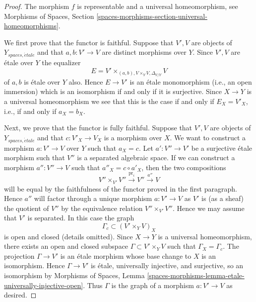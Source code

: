 \documentclass[10pt,a4paper]{amsart}
\theoremstyle{plain}
\theoremstyle{definition}
\theoremstyle{remark}
\numberwithin{equation}{subsection}
\def\etale{{\acute{e}tale}}
\begin{document}
\begin{proof}
The morphism $f$ is representable and a universal homeomorphism, see
Morphisms of Spaces,
Section \ref{spaces-morphisms-section-universal-homeomorphisms}.

\medskip\noindent
We first prove that the functor is faithful.
Suppose that $V', V$ are objects of $Y_{spaces, \etale}$ and
that $a, b : V' \to V$ are distinct morphisms over $Y$.
Since $V', V$ are \'etale over $Y$ the equalizer
$$
E =  V' \times_{(a, b), V \times_Y V, \Delta_{V/Y}} V
$$
of $a, b$ is \'etale over $Y$ also. Hence $E \to V'$ is an \'etale monomorphism
(i.e., an open immersion) which is an isomorphism if and only if it is
surjective. Since $X \to Y$ is a universal homeomorphism we see that this
is the case if and only if $E_X = V'_X$, i.e., if and only if $a_X = b_X$.

\medskip\noindent
Next, we prove that the functor is fully faithful.
Suppose that $V', V$ are objects of $Y_{spaces, \etale}$ and
that $c : V'_X \to V_X$ is a morphism over $X$. We want to construct
a morphism $a : V' \to V$ over $Y$ such that $a_X = c$.
Let $a' : V'' \to V'$ be a surjective \'etale morphism such that $V''$ is
a separated algebraic space. If we can construct a morphism
$a'' : V'' \to V$ such that $a''_X = c \circ a'_X$, then the two compositions
$$
V'' \times_{V'} V'' \xrightarrow{\text{pr}_i} V'' \xrightarrow{a''} V
$$
will be equal by the faithfulness of the functor proved in the first
paragraph. Hence $a''$ will factor through a unique morphism
$a : V' \to V$ as $V'$ is (as a sheaf) the quotient of $V''$ by
the equivalence relation $V'' \times_{V'} V''$. Hence we may assume that
$V'$ is separated. In this case the graph
$$
\Gamma_c \subset (V' \times_Y V)_X
$$
is open and closed (details omitted). Since $X \to Y$ is a universal
homeomorphism, there exists an open and closed subspace
$\Gamma \subset V' \times_Y V$ such that $\Gamma_X = \Gamma_c$.
The projection $\Gamma \to V'$ is an \'etale morphism whose base
change to $X$ is an isomorphism. Hence $\Gamma \to V'$ is \'etale,
universally injective, and surjective, so an isomorphism by
Morphisms of Spaces,
Lemma \ref{spaces-morphisms-lemma-etale-universally-injective-open}.
Thus $\Gamma$ is the graph of a morphism $a : V' \to V$ as desired.


\end{proof}
\end{document}
